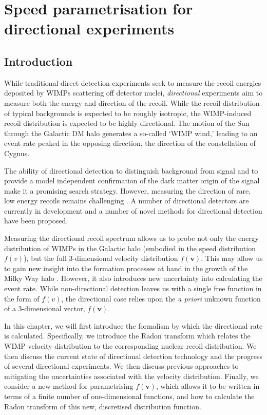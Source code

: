 \chapter{Speed parametrisation for directional experiments}

\section{Introduction}

While traditional direct detection experiments seek to measure the recoil energies deposited by WIMPs scattering off detector nuclei, \textit{directional} experiments aim to measure both the energy and direction of the recoil. While the recoil distribution of typical backgrounds is expected to be roughly isotropic, the WIMP-induced recoil distribution is expected to be highly directional. The motion of the Sun through the Galactic DM halo generates a so-called `WIMP wind,' leading to an event rate peaked in the opposing direction, the direction of the constellation of Cygnus. 

The ability of directional detection to distinguish background from signal and to provide a model independent confirmation of the dark matter origin of the signal make it a promising search strategy. However, measuring the direction of rare, low energy recoils remains challenging \cite{}. A number of directional detectors are currently in development and a number of novel methods for directional detection have been proposed.

Measuring the directional recoil spectrum allows us to probe not only the energy distribution of WIMPs in the Galactic halo (embodied in the speed distribution $f(v)$), but the full 3-dimensional velocity distribution $f(\textbf{v})$. This may allow us to gain new insight into the formation processes at hand in the growth of the Milky Way halo \cite{}. However, it also introduces new uncertainty into calculating the event rate. While non-directional detection leaves us with a single free function in the form of  $f(v)$, the directional case relies upon the \textit{a priori} unknown function of a 3-dimensional vector, $f(\textbf{v})$.

In this chapter, we will first introduce the formalism by which the directional rate is calculated. Specifically, we introduce the Radon transform which relates the WIMP velocity distribution to the corresponding nuclear recoil distribution.  We then discuss the current state of directional detection technology and the progress of several directional experiments. We then discuss previous approaches to mitigating the uncertainties associated with the velocity distribution. Finally, we consider a new method for parametrising $f(\textbf{v})$, which allows it to be written in terms of a finite number of one-dimensional functions, and how to calculate the Radon transform of this new, discretised distribution function.
